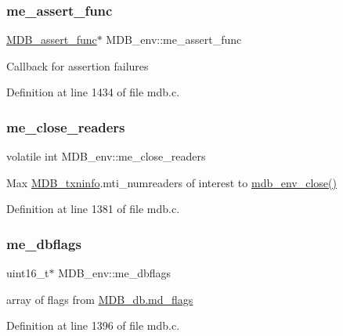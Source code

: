 \subsubsection{\texorpdfstring{me\+\_\+assert\+\_\+func}{me\_assert\_func}}
{\footnotesize\ttfamily \mbox{\hyperlink{group__mdb_ga949ada362b3e84ec0435197056d82371}{M\+D\+B\+\_\+assert\+\_\+func}}$\ast$ M\+D\+B\+\_\+env\+::me\+\_\+assert\+\_\+func}

Callback for assertion failures 

Definition at line 1434 of file mdb.\+c.

\mbox{\label{struct_m_d_b__env_a65a505dc850aa444442b4cbe1d3eaa3d}} 
\subsubsection{\texorpdfstring{me\+\_\+close\+\_\+readers}{me\_close\_readers}}
{\footnotesize\ttfamily volatile int M\+D\+B\+\_\+env\+::me\+\_\+close\+\_\+readers}

Max \mbox{\hyperlink{struct_m_d_b__txninfo}{M\+D\+B\+\_\+txninfo}}.mti\+\_\+numreaders of interest to \mbox{\hyperlink{group__mdb_ga4366c43ada8874588b6a62fbda2d1e95}{mdb\+\_\+env\+\_\+close()}} 

Definition at line 1381 of file mdb.\+c.

\mbox{\label{struct_m_d_b__env_a84e30bf602ca2810dc1f5ff8a474b86d}} 
\subsubsection{\texorpdfstring{me\+\_\+dbflags}{me\_dbflags}}
{\footnotesize\ttfamily uint16\+\_\+t$\ast$ M\+D\+B\+\_\+env\+::me\+\_\+dbflags}

array of flags from \mbox{\hyperlink{struct_m_d_b__db_a91a11c5c8034bd175eb0dd01da528981}{M\+D\+B\+\_\+db.\+md\+\_\+flags}} 

Definition at line 1396 of file mdb.\+c.

\mbox{\label{struct_m_d_b__env_a7fd1b52643fcf729f927469d28d1b1c4}} 

